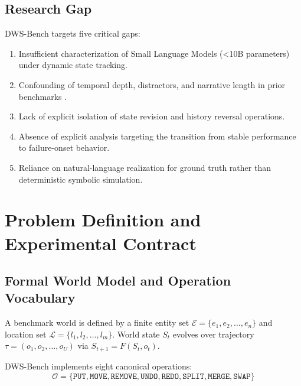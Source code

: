 \documentclass{iutbscthesis}
\begin{document}
\section{Research Gap}
DWS-Bench targets five critical gaps:
\begin{enumerate}[noitemsep]
    \item Insufficient characterization of Small Language Models (<10B parameters) under dynamic state tracking.
    \item Confounding of temporal depth, distractors, and narrative length in prior benchmarks \cite{kim2023entity, rezaee2025exploring}.
    \item Lack of explicit isolation of state revision and history reversal operations.
    \item Absence of explicit analysis targeting the transition from stable performance to failure-onset behavior.
    \item Reliance on natural-language realization for ground truth rather than deterministic symbolic simulation.
\end{enumerate}

\chapter{Problem Definition and Experimental Contract}

\section{Formal World Model and Operation Vocabulary}
A benchmark world is defined by a finite entity set $\mathcal{E} = \{e_1, e_2, \ldots, e_n\}$ and location set $\mathcal{L} = \{l_1, l_2, \ldots, l_m\}$. World state $S_t$ evolves over trajectory $\tau = (o_1, o_2, \ldots, o_U)$ via $S_{t+1} = F(S_t, o_t)$.

DWS-Bench implements eight canonical operations:
\begin{equation}
\mathcal{O} = \{\texttt{PUT}, \texttt{MOVE}, \texttt{REMOVE}, \texttt{UNDO}, \texttt{REDO}, \texttt{SPLIT}, \texttt{MERGE}, \texttt{SWAP}\}
\end{equation}
\end{document}
